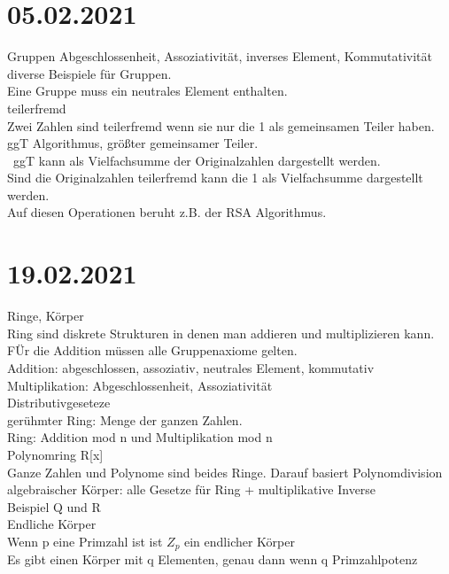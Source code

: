 \documentclass{article}
\begin{document}
	\section*{05.02.2021}
	Gruppen
	Abgeschlossenheit, Assoziativität, inverses Element, Kommutativität \\
	diverse Beispiele für Gruppen. \\
	Eine Gruppe muss ein neutrales Element enthalten. \\
	teilerfremd \\
	Zwei Zahlen sind teilerfremd wenn sie nur die 1 als gemeinsamen Teiler haben. 
	ggT Algorithmus, größter gemeinsamer Teiler. \\\
	ggT kann als Vielfachsumme der Originalzahlen dargestellt werden. \\
	Sind die Originalzahlen teilerfremd kann die 1 als Vielfachsumme dargestellt werden. \\
	Auf diesen Operationen beruht z.B. der RSA Algorithmus. \\
	\section*{19.02.2021}
	Ringe, Körper \\
	Ring sind diskrete Strukturen in denen man addieren und multiplizieren kann. \\
	FÜr die Addition müssen alle Gruppenaxiome gelten. \\
	Addition: abgeschlossen, assoziativ, neutrales Element, kommutativ \\
	Multiplikation: Abgeschlossenheit, Assoziativität \\
	Distributivgeseteze \\
	gerühmter Ring: Menge der ganzen Zahlen. \\
	Ring: Addition mod n und Multiplikation mod n \\
	Polynomring R[x] \\
	Ganze Zahlen und Polynome sind beides Ringe. Darauf basiert Polynomdivision \\
	algebraischer Körper: alle Gesetze für Ring + multiplikative Inverse \\
	Beispiel Q und R\\
	Endliche Körper \\
	Wenn p eine Primzahl ist ist $Z_p$ ein endlicher Körper \\
	Es gibt einen Körper mit q Elementen, genau dann wenn q Primzahlpotenz \\
\end{document}
